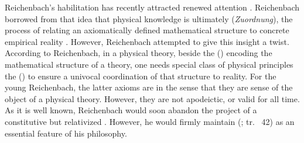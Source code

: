 \documentclass[draft]{article}
\newcommand{\WT}{Weyl's theory\xspace}
\newcommand{\rhp}[2]{(\cite[#1]{Reichenbach1920a}; tr.\ \citeyear{Reichenbach1969} #2)\xspace}
\begin{document}

Reichenbach's habilitation has recently attracted renewed attention \citep{Friedman2001}. Reichenbach borrowed from \citet{Schlick1918} that idea that physical knowledge is ultimately (\emph{Zuordnung}), the process of relating an axiomatically defined mathematical structure to concrete empirical reality \citep{Padovani2009}. However, Reichenbach attempted  to give this insight a  twist. According to Reichenbach, in a physical theory, beside the  () encoding the mathematical structure of a theory, one needs special class of physical principles the  () to ensure a univocal coordination of that structure to reality. For the young Reichenbach, the latter axioms are \apr in the sense that they are  sense of the object of a physical theory. However, they are not apodeictic, or valid for all time. As it is well known, Reichenbach would soon abandon the project of a constitutive but relativized \apr. However, he would firmly maintain  \rhp{40}{42} as an essential feature of his philosophy.







\end{document}

